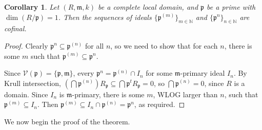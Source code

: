 \documentclass[11pt]{book}
\newtheorem{corollary}[theorem]{Corollary}
\numberwithin{equation}{section}
\numberwithin{theorem}{chapter}
\theoremstyle{definition}
\newtheorem*{basic properties}{Basic Properties}
\newtheorem*{Important Remark}{Important Remark}
\theoremstyle{remark}
\newcommand{\NN}{\mathbb{N}}
\newcommand{\m}{\mathfrak{m}}
\newcommand{\V}{\mathcal{V}}
\newcommand{\p}{\mathfrak{p}}
\renewcommand{\dim}{\operatorname{dim}}
\begin{document}
\begin{corollary}
	Let $(R,\m,k)$ be a complete local domain, and $\p$ be a prime with $\dim(R/\p)=1$. Then the sequences of ideals $\{\p^{(m)}\}_{m \in \NN}$ and $\{\p^{n}\}_{n \in \NN}$ are cofinal.
\end{corollary}
\begin{proof}
	Clearly $\p^{n} \subseteq \p^{(n)}$ for all $n$, so we need to show that for each $n$, there is some $m$ such that $\p^{(m)}\subseteq \p^n$. 
	
	Since $\V(\p)=\{\p,\m\}$, every $\p^n=\p^{(n)}\cap I_n$ for some $\m$-primary ideal $I_n$. By Krull intersection, $(\bigcap \p^{(n)})R_\p \subseteq \bigcap \p^t R_\p = 0$, so $\bigcap \p^{(n)}=0$, since $R$ is a domain. Since $I_n$ is $\m$-primary, there is some $m$, WLOG larger than $n$, such that $\p^{(m)}\subseteq I_n$. Then $\p^{(m)}\subseteq I_n \cap \p^{(n)} = \p^n$, as required.
\end{proof}

We now begin the proof of the theorem.
\end{document}
